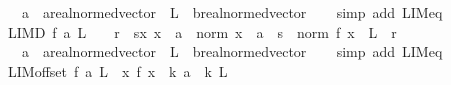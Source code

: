 \begin{isabellebody}
\ \ \ a\ {\isacharcolon}{\kern0pt}{\isacharcolon}{\kern0pt}\ {\isachardoublequoteopen}{\isacharprime}{\kern0pt}a{\isacharcolon}{\kern0pt}{\isacharcolon}{\kern0pt}real{\isacharunderscore}{\kern0pt}normed{\isacharunderscore}{\kern0pt}vector{\isachardoublequoteclose}\ \ L\ {\isacharcolon}{\kern0pt}{\isacharcolon}{\kern0pt}\ {\isachardoublequoteopen}{\isacharprime}{\kern0pt}b{\isacharcolon}{\kern0pt}{\isacharcolon}{\kern0pt}real{\isacharunderscore}{\kern0pt}normed{\isacharunderscore}{\kern0pt}vector{\isachardoublequoteclose}\isanewline
%
\isadelimproof
\ \ %
\endisadelimproof
%
\isatagproof
{}\isamarkupfalse%
\ {\isacharparenleft}{\kern0pt}simp\ add{\isacharcolon}{\kern0pt}\ LIM{\isacharunderscore}{\kern0pt}eq{\isacharparenright}{\kern0pt}%
\endisatagproof
{\isafoldproof}%
%
\isadelimproof
\isanewline
%
\endisadelimproof
\isanewline
{}\isamarkupfalse%
\ LIM{\isacharunderscore}{\kern0pt}D{\isacharcolon}{\kern0pt}\ {\isachardoublequoteopen}f\ {\isasymmidarrow}a{\isasymrightarrow}\ L\ {\isasymLongrightarrow}\ {}\ {\isacharless}{\kern0pt}\ r\ {\isasymLongrightarrow}\ {\isasymexists}s{\isachargreater}{\kern0pt}{}{\isachardot}{\kern0pt}{\isasymforall}x{\isachardot}{\kern0pt}\ x\ {\isasymnoteq}\ a\ {\isasymand}\ norm\ {\isacharparenleft}{\kern0pt}x\ {\isacharminus}{\kern0pt}\ a{\isacharparenright}{\kern0pt}\ {\isacharless}{\kern0pt}\ s\ {\isasymlongrightarrow}\ norm\ {\isacharparenleft}{\kern0pt}f\ x\ {\isacharminus}{\kern0pt}\ L{\isacharparenright}{\kern0pt}\ {\isacharless}{\kern0pt}\ r{\isachardoublequoteclose}\isanewline
\ \ \ a\ {\isacharcolon}{\kern0pt}{\isacharcolon}{\kern0pt}\ {\isachardoublequoteopen}{\isacharprime}{\kern0pt}a{\isacharcolon}{\kern0pt}{\isacharcolon}{\kern0pt}real{\isacharunderscore}{\kern0pt}normed{\isacharunderscore}{\kern0pt}vector{\isachardoublequoteclose}\ \ L\ {\isacharcolon}{\kern0pt}{\isacharcolon}{\kern0pt}\ {\isachardoublequoteopen}{\isacharprime}{\kern0pt}b{\isacharcolon}{\kern0pt}{\isacharcolon}{\kern0pt}real{\isacharunderscore}{\kern0pt}normed{\isacharunderscore}{\kern0pt}vector{\isachardoublequoteclose}\isanewline
%
\isadelimproof
\ \ %
\endisadelimproof
%
\isatagproof
{}\isamarkupfalse%
\ {\isacharparenleft}{\kern0pt}simp\ add{\isacharcolon}{\kern0pt}\ LIM{\isacharunderscore}{\kern0pt}eq{\isacharparenright}{\kern0pt}%
\endisatagproof
{\isafoldproof}%
%
\isadelimproof
\isanewline
%
\endisadelimproof
\isanewline
{}\isamarkupfalse%
\ LIM{\isacharunderscore}{\kern0pt}offset{\isacharcolon}{\kern0pt}\ {\isachardoublequoteopen}f\ {\isasymmidarrow}a{\isasymrightarrow}\ L\ {\isasymLongrightarrow}\ {\isacharparenleft}{\kern0pt}{\isasymlambda}x{\isachardot}{\kern0pt}\ f\ {\isacharparenleft}{\kern0pt}x\ {\isacharplus}{\kern0pt}\ k{\isacharparenright}{\kern0pt}{\isacharparenright}{\kern0pt}\ {\isasymmidarrow}{\isacharparenleft}{\kern0pt}a\ {\isacharminus}{\kern0pt}\ k{\isacharparenright}{\kern0pt}{\isasymrightarrow}\ L{\isachardoublequoteclose}\isanewline

\end{isabellebody}
